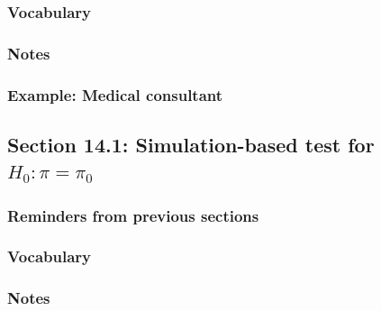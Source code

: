 \documentclass[
]{report}
\begin{document}
\hypertarget{vocabulary-10}{%
\subsubsection*{Vocabulary}\label{vocabulary-10}}

\hypertarget{notes-14}{%
\subsubsection*{Notes}\label{notes-14}}

\hypertarget{example-medical-consultant}{%
\subsubsection*{Example: Medical consultant}\label{example-medical-consultant}}

\hypertarget{section-14.1-simulation-based-test-for-h_0pi-pi_0}{%
\subsection*{\texorpdfstring{Section 14.1: Simulation-based test for \(H_0:\pi = \pi_0\)}{Section 14.1: Simulation-based test for H\_0:\textbackslash pi = \textbackslash pi\_0}}\label{section-14.1-simulation-based-test-for-h_0pi-pi_0}}

\hypertarget{reminders-from-previous-sections-2}{%
\subsubsection*{Reminders from previous sections}\label{reminders-from-previous-sections-2}}

\hypertarget{vocabulary-11}{%
\subsubsection*{Vocabulary}\label{vocabulary-11}}

\hypertarget{notes-15}{%
\subsubsection*{Notes}\label{notes-15}}
\end{document}
